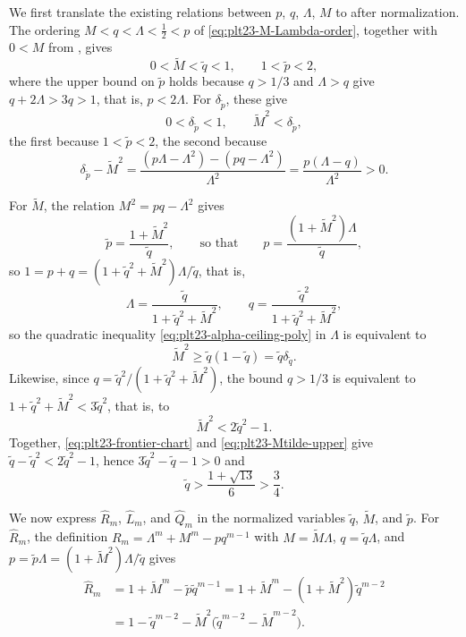 ﻿\documentclass[11pt]{article}
\numberwithin{equation}{section}
\begin{document}
We first translate the existing relations between $p$, $q$, $\Lambda$, $M$ to after normalization.
The ordering $M<q<\Lambda<\frac12<p$ of \eqref{eq:plt23-M-Lambda-order}, together with $0<M$ from , gives
\begin{equation}\label{eq:plt23-tilde-order}
  0<\tilde M<\tilde q<1,
  \qquad
  1<\tilde p<2,
\end{equation}
where the upper bound on $\tilde p$ holds because $q>1/3$ and $\Lambda>q$ give $q+2\Lambda>3q>1$, that is, $p<2\Lambda$.
For $\delta_{\tilde p}$, these give
\begin{equation}\label{eq:plt23-zeta-v-consequences}
  0<\delta_{\tilde p}<1,
  \qquad
  \tilde M^2<\delta_{\tilde p},
\end{equation}
the first because $1<\tilde p<2$, the second because
\[
  \delta_{\tilde p}-\tilde M^2
  =\frac{(p\Lambda-\Lambda^2)-(pq-\Lambda^2)}{\Lambda^2}
  =\frac{p(\Lambda-q)}{\Lambda^2}>0.
\]

For $\tilde M$, the relation $M^2=pq-\Lambda^2$ gives
\[
  \tilde p=\frac{1+\tilde M^2}{\tilde q},
  \qquad\text{so that}\qquad
  p=\frac{(1+\tilde M^2)\Lambda}{\tilde q},
\]
so $1=p+q=(1+\tilde q^2+\tilde M^2)\Lambda/\tilde q$, that is,
\[
  \Lambda=\frac{\tilde q}{1+\tilde q^2+\tilde M^2},
  \qquad
  q=\frac{\tilde q^2}{1+\tilde q^2+\tilde M^2},
\]
so the quadratic inequality \eqref{eq:plt23-alpha-ceiling-poly} in $\Lambda$ is equivalent to
\begin{equation}\label{eq:plt23-frontier-chart}
  \tilde M^2\ge \tilde q(1-\tilde q)=\tilde q\delta_{\tilde q}.
\end{equation}
Likewise, since $q=\tilde q^2/(1+\tilde q^2+\tilde M^2)$, the bound $q>1/3$ is equivalent to $1+\tilde q^2+\tilde M^2<3\tilde q^2$, that is, to
\begin{equation}\label{eq:plt23-Mtilde-upper}
  \tilde M^2<2\tilde q^2-1.
\end{equation}
Together, \eqref{eq:plt23-frontier-chart} and \eqref{eq:plt23-Mtilde-upper} give $\tilde q-\tilde q^2<2\tilde q^2-1$, hence $3\tilde q^2-\tilde q-1>0$ and
\begin{equation}\label{eq:plt23-qtilde-lower}
  \tilde q>\frac{1+\sqrt{13}}6>\frac34.
\end{equation}

We now express $\widehat R_m$, $\widehat L_m$, and $\widehat Q_m$ in the normalized variables $\tilde q$, $\tilde M$, and $\tilde p$.
For $\widehat R_m$, the definition $R_m=\Lambda^m+M^m-pq^{m-1}$ with $M=\tilde M\Lambda$, $q=\tilde q\Lambda$, and $p=\tilde p\Lambda=(1+\tilde M^2)\Lambda/\tilde q$ gives
\begin{align}
  \widehat R_m
  &=1+\tilde M^m-\tilde p\tilde q^{m-1}
   =1+\tilde M^m-(1+\tilde M^2)\tilde q^{m-2}
  \nonumber\\
  &=1-\tilde q^{m-2}-\tilde M^2\bigl(\tilde q^{m-2}-\tilde M^{m-2}\bigr).
  \label{eq:plt23-F-formula}
\end{align}
\end{document}
